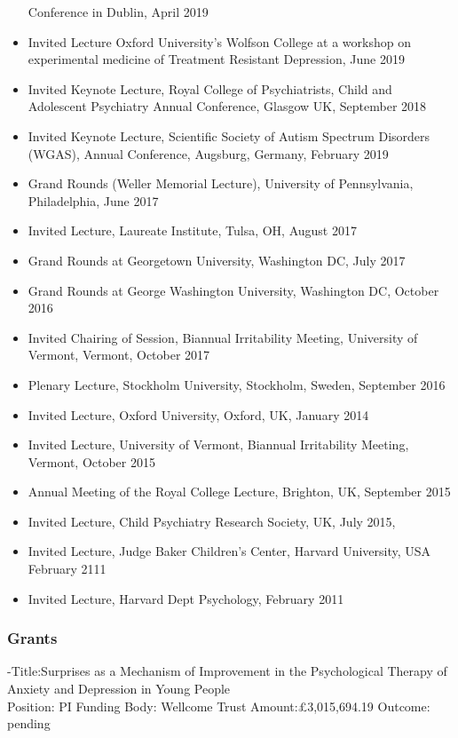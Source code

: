 \documentclass[
]{article}
\begin{document}
\begin{itemize}
  Conference in Dublin, April 2019
\item
  Invited Lecture Oxford University's Wolfson College at a workshop on
  experimental medicine of Treatment Resistant Depression, June 2019
\item
  Invited Keynote Lecture, Royal College of Psychiatrists, Child and
  Adolescent Psychiatry Annual Conference, Glasgow UK, September 2018
\item
  Invited Keynote Lecture, Scientific Society of Autism Spectrum
  Disorders (WGAS), Annual Conference, Augsburg, Germany, February 2019
\item
  Grand Rounds (Weller Memorial Lecture), University of Pennsylvania,
  Philadelphia, June 2017
\item
  Invited Lecture, Laureate Institute, Tulsa, OH, August 2017
\item
  Grand Rounds at Georgetown University, Washington DC, July 2017
\item
  Grand Rounds at George Washington University, Washington DC, October
  2016
\item
  Invited Chairing of Session, Biannual Irritability Meeting, University
  of Vermont, Vermont, October 2017
\item
  Plenary Lecture, Stockholm University, Stockholm, Sweden, September
  2016
\item
  Invited Lecture, Oxford University, Oxford, UK, January 2014
\item
  Invited Lecture, University of Vermont, Biannual Irritability Meeting,
  Vermont, October 2015
\item
  Annual Meeting of the Royal College Lecture, Brighton, UK, September
  2015
\item
  Invited Lecture, Child Psychiatry Research Society, UK, July 2015,
\item
  Invited Lecture, Judge Baker Children's Center, Harvard University,
  USA February 2111
\item
  Invited Lecture, Harvard Dept Psychology, February 2011
\end{itemize}

\hypertarget{grants}{%
\subsubsection{Grants}\label{grants}}

-Title:Surprises as a Mechanism of Improvement in the Psychological
Therapy of Anxiety and Depression in Young People\\
Position: PI Funding Body: Wellcome Trust Amount:£3,015,694.19 Outcome:
pending
\end{document}
